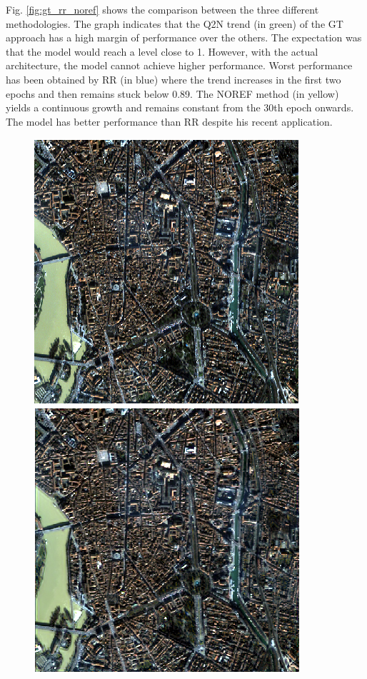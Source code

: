 \documentclass[12pt]{report}
\begin{document}
Fig. \ref{fig:gt_rr_noref} shows the comparison between the three different methodologies. 
The graph indicates that the Q2N trend (in green) of the GT approach has a high margin of performance over the others. The expectation was that the model would reach a level close to 1. However, with the actual architecture, the model cannot achieve higher performance.
Worst performance has been obtained by RR (in blue) where the trend increases in the first two epochs and then remains stuck below 0.89. 
The NOREF method (in yellow) yields a continuous growth and remains constant from the 30th epoch onwards. 
The model has better performance than RR despite his recent application.



\begin{figure}
    \centering
    \includegraphics[scale=.6]{Target.png}
    \includegraphics[scale=.6]{GT.png}

\end{figure}
\end{document}
